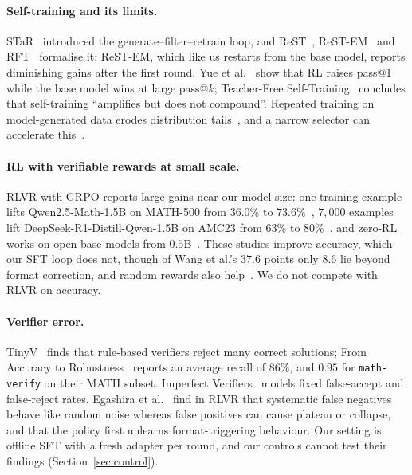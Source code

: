\documentclass[runningheads]{llncs}
\begin{document}
\paragraph{Self-training and its limits.}
STaR~\cite{ref_star} introduced the generate--filter--retrain loop, and
ReST~\cite{ref_rest}, ReST-EM~\cite{ref_restem} and RFT~\cite{ref_rft} formalise
it; ReST-EM, which like us restarts from the base model, reports
diminishing gains after the first round. Yue et al.~\cite{ref_rllimit} show that RL
raises pass@1 while the base model wins at large pass@$k$; Teacher-Free
Self-Training~\cite{ref_teacherfree} concludes that self-training ``amplifies but
does not compound''. Repeated training on model-generated data erodes
distribution tails~\cite{ref_collapse}, and a narrow selector can accelerate
this~\cite{ref_selectionbias}.

\paragraph{RL with verifiable rewards at small scale.}
RLVR with GRPO reports large gains near our model size: one training example
lifts Qwen2.5-Math-1.5B on MATH-500 from $36.0\%$ to $73.6\%$~\cite{ref_oneshot},
$7{,}000$ examples lift DeepSeek-R1-Distill-Qwen-1.5B on AMC23 from $63\%$
to $80\%$~\cite{ref_openrs}, and zero-RL works on open base models from $0.5$B~\cite{ref_simplerl}. These studies improve
accuracy, which our SFT loop does not, though of Wang et al.'s $37.6$ points only $8.6$ lie beyond format correction, and random rewards also help~\cite{ref_spurious}. We do not compete with RLVR on accuracy.

\paragraph{Verifier error.}
TinyV~\cite{ref_tinyv} finds that rule-based verifiers reject many correct
solutions; From Accuracy to Robustness~\cite{ref_robustness} reports an average
recall of $86\%$, and $0.95$ for \texttt{math-verify} on their MATH subset.
Imperfect Verifiers~\cite{ref_imperfect} models fixed false-accept and
false-reject rates. Egashira et al.~\cite{ref_delayplateau} find in RLVR that
systematic false negatives behave like random noise whereas false positives can
cause plateau or collapse, and that the policy first unlearns format-triggering behaviour. Our setting is
offline SFT with a fresh adapter per round, and our
controls cannot test their findings (Section~\ref{sec:control}).
\end{document}
